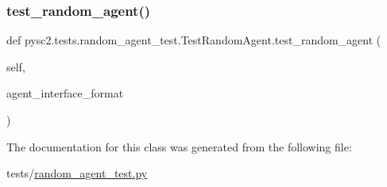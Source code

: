 \subsubsection{\texorpdfstring{test\+\_\+random\+\_\+agent()}{test\_random\_agent()}}
{\footnotesize\ttfamily def pysc2.\+tests.\+random\+\_\+agent\+\_\+test.\+Test\+Random\+Agent.\+test\+\_\+random\+\_\+agent (\begin{DoxyParamCaption}\item[{}]{self,  }\item[{}]{agent\+\_\+interface\+\_\+format }\end{DoxyParamCaption})}



The documentation for this class was generated from the following file\+:\begin{DoxyCompactItemize}
\item 
tests/\mbox{\hyperlink{random__agent__test_8py}{random\+\_\+agent\+\_\+test.\+py}}\end{DoxyCompactItemize}

